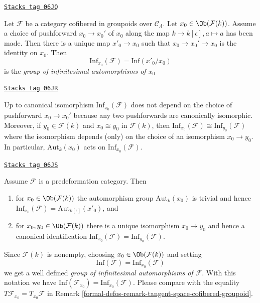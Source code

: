\begin{definition}
\label{formal-defos-definition-infinitesimal-auts}
\href{https://stacks.math.columbia.edu/tag/06JQ}{\texttt{Stacks tag 06JQ}}

Let $\mathcal{F}$ be a category cofibered in groupoids over $\mathcal
C_\Lambda$. Let $x_0 \in \Ob(\mathcal{F}(k))$. Assume a choice of
pushforward $x_0 \to x_0'$ of $x_0$ along the map
$k \to k[\epsilon], a \mapsto a$ has been made.
Then there is a unique map $x'_0 \to x_0$ such that
$x_0 \to x_0' \to x_0$ is the identity on $x_0$.
Then
$$
\text{Inf}_{x_0}(\mathcal F) = \text{Inf}(x'_0/x_0)
$$
is the {\it group of infinitesimal automorphisms of $x_0$}
\end{definition}

\begin{remark}
\label{formal-defos-remark-choice-pushforward-immaterial-infinitesimal-aut}
\href{https://stacks.math.columbia.edu/tag/06JR}{\texttt{Stacks tag 06JR}}

Up to canonical isomorphism $\text{Inf}_{x_0}(\mathcal{F})$
does not depend on the choice of pushforward $x_0 \to x_0'$
because any two pushforwards are canonically isomorphic.
Moreover, if $y_0 \in \mathcal{F}(k)$ and $x_0 \cong y_0$ in
$\mathcal{F}(k)$, then
$\text{Inf}_{x_0}(\mathcal{F}) \cong \text{Inf}_{y_0}(\mathcal{F})$
where the isomorphism depends (only) on the choice of an isomorphism
$x_0 \to y_0$. In particular, $\text{Aut}_k(x_0)$
acts on $\text{Inf}_{x_0}(\mathcal{F})$.
\end{remark}

\begin{remark}
\label{formal-defos-remark-trivial-aut-point}
\href{https://stacks.math.columbia.edu/tag/06JS}{\texttt{Stacks tag 06JS}}

Assume $\mathcal{F}$ is a predeformation category. Then
\begin{enumerate}
\item for $x_0 \in \Ob(\mathcal{F}(k))$ the automorphism group
$\text{Aut}_k(x_0)$ is trivial and hence
$\text{Inf}_{x_0}(\mathcal{F}) = \text{Aut}_{k[\epsilon]}(x'_0)$, and
\item for $x_0, y_0 \in \Ob(\mathcal{F}(k))$ there is a unique
isomorphism $x_0 \to y_0$ and hence a canonical identification
$\text{Inf}_{x_0}(\mathcal{F}) = \text{Inf}_{y_0}(\mathcal{F})$.
\end{enumerate}
Since $\mathcal{F}(k)$ is nonempty, choosing $x_0 \in \Ob(\mathcal{F}(k))$
and setting
$$
\text{Inf}(\mathcal{F}) = \text{Inf}_{x_0}(\mathcal{F})
$$
we get a well defined {\it group of infinitesimal automorphisms
of $\mathcal{F}$}. With this notation we have
$\text{Inf}(\mathcal{F}_{x_0}) = \text{Inf}_{x_0}(\mathcal{F})$.
Please compare with the equality
$T\mathcal{F}_{x_0} = T_{x_0}\mathcal{F}$
in Remark \ref{formal-defos-remark-tangent-space-cofibered-groupoid}.
\end{remark}

